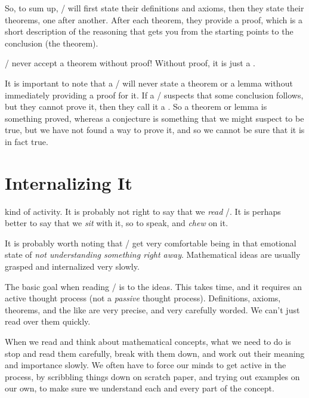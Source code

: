 \documentclass[../../../main.tex]{subfiles}
\begin{document}
\noindent
So, to sum up, \mathers/ will first state their definitions and axioms, then they state their theorems, one after another. After each theorem, they provide a proof, which is a short description of the reasoning that gets you from the starting points to the conclusion (the theorem).

\begin{terminology}
  \Mathers/ never accept a theorem without proof! Without proof, it is just a .
\end{terminology}

It is important to note that a \mather/ will never state a theorem or a lemma without immediately providing a proof for it. If a \mather/ suspects that some conclusion follows, but they cannot prove it, then they call it a . So a theorem or lemma is something proved, whereas a conjecture is something that we might suspect to be true, but we have not found a way to prove it, and so we cannot be sure that it is in fact true.




\section{Internalizing It}

 kind of activity. It is probably not right to say that we \emph{read} \math/. It is perhaps better to say that we \emph{sit} with it, so to speak, and \emph{chew} on it.

\begin{aside}
  \begin{remark}
    It is probably worth noting that \mathers/ get very comfortable being in that emotional state of \emph{not understanding something right away}. Mathematical ideas are usually grasped and internalized very slowly.
  \end{remark}
\end{aside}

The basic goal when reading \math/ is to  the ideas. This takes time, and it requires an active thought process (not a \emph{passive} thought process). Definitions, axioms, theorems, and the like are very precise, and very carefully worded. We can't just read over them quickly. 

When we read and think about mathematical concepts, what we need to do is stop and read them carefully, break with them down, and work out their meaning and importance slowly. We often have to force our minds to get active in the process, by scribbling things down on scratch paper, and trying out examples on our own, to make sure we understand each and every part of the concept. 
\end{document}
